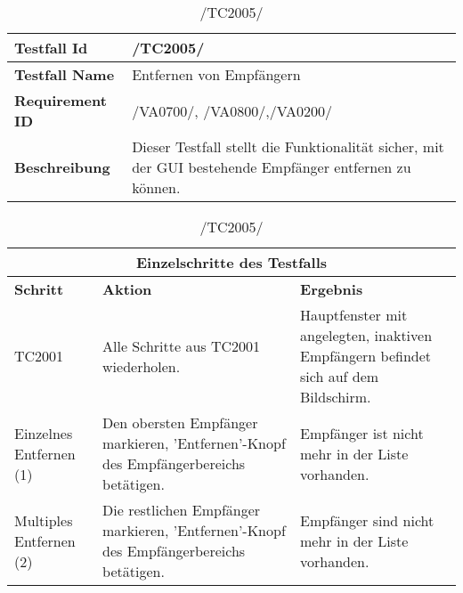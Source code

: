 \begin{table}[h]
\caption{/TC2005/}
\label{tab:TC2005}
\begin{center}
\begin{tabular}{|p{3.5cm}|p{12cm}|}
\hline
\textbf{Testfall Id} & /TC2005/\\
\hline
\textbf{Testfall Name} & Entfernen von Empfängern\\
\hline
\textbf{Requirement ID} & /VA0700/, /VA0800/,/VA0200/\\
\hline
\textbf{Beschreibung} & Dieser Testfall stellt die Funktionalität sicher, mit
der GUI bestehende Empfänger entfernen zu können.\\
\hline
\end{tabular}
\begin{tabular}{|p{2.5cm}|p{5cm}|p{7.55cm}|}
\multicolumn{3}{|c|}{\textbf{Einzelschritte des Testfalls}} \\
\hline
\textbf{Schritt} & \textbf{Aktion} & \textbf{Ergebnis}\\
\hline
TC2001& Alle Schritte aus TC2001 wiederholen. & Hauptfenster mit angelegten,
inaktiven Empfängern befindet sich auf dem Bildschirm.\\
\hline
Einzelnes Entfernen (1) & Den obersten Empfänger markieren,
'Entfernen'-Knopf des Empfängerbereichs betätigen. & Empfänger ist nicht mehr
in der Liste vorhanden.\\
\hline
Multiples Entfernen (2) & Die restlichen Empfänger markieren,
'Entfernen'-Knopf des Empfängerbereichs betätigen. & Empfänger sind nicht mehr
in der Liste vorhanden.\\
\hline
\end{tabular}
\end{center}
\label{default}
\end{table}

